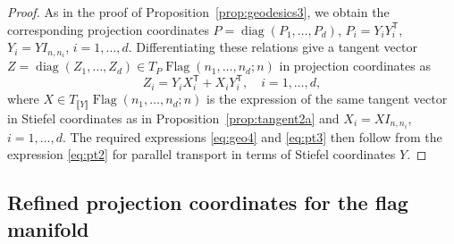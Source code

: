 \documentclass[11pt,reqno]{amsart}%
\theoremstyle{definition}
\theoremstyle{remark}
\newcommand{\tp}{{\scriptscriptstyle\mathsf{T}}}
\newcommand{\lb}{\llbracket}
\newcommand{\rb}{\rrbracket}
\DeclareMathOperator{\Flag}{Flag}
\DeclareMathOperator{\diag}{diag}
\begin{document}
\begin{proof}
As in the proof of Proposition~\ref{prop:geodesics3}, we obtain the corresponding projection coordinates $P = \diag(P_1,\dots, P_d)$, $P_i = Y_i Y_i^\tp$, $Y_i = YI_{n,n_i}$, $i=1,\dots, d$. Differentiating these relations give a tangent vector $Z = \diag (Z_1,\dots, Z_d)\in T_P \Flag(n_1,\dots,n_d;n)$ in projection coordinates as
\[
Z_i = Y_i X_i^\tp + X_iY_i^\tp,\quad i=1,\dots, d,
\]  
where $X\in T_{\lb Y \rb} \Flag(n_1,\dots,n_d;n)$ is the expression of the same tangent vector in Stiefel coordinates as in Proposition~\ref{prop:tangent2a} and $X_i = XI_{n,n_i}$, $i=1,\dots, d$. The required expressions \eqref{eq:geo4} and \eqref{eq:pt3} then follow from the expression \eqref{eq:pt2}  for parallel transport in terms of Stiefel coordinates $Y$.
\end{proof}

\subsection{Refined projection coordinates for the flag manifold}\label{sec:rproj}
\end{document}
